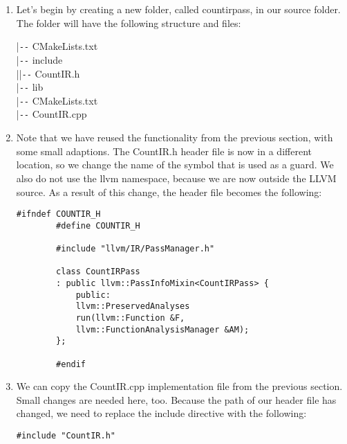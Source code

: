 \begin{enumerate}
	\item Let's begin by creating a new folder, called countirpass, in our source folder. The 
	folder will have the following structure and files:
	\begin{tcolorbox}[colback=white,colframe=black]
		|\verb|--| CMakeLists.txt \\
		|\verb|--| include \\
		|\hspace{1cm}|\verb|--| CountIR.h \\
		|\verb|--| lib \\
		\hspace*{0.8cm}|\verb|--| CMakeLists.txt \\
		\hspace*{0.8cm}|\verb|--| CountIR.cpp
	\end{tcolorbox}
	
	\item Note that we have reused the functionality from the previous section, with some small adaptions. The CountIR.h header file is now in a different location, so we change the name of the symbol that is used as a guard. We also do not use the llvm namespace, because we are now outside the LLVM source. As a result of this change, the header file becomes the following:
	\begin{lstlisting}[caption={}]
		#ifndef COUNTIR_H
		#define COUNTIR_H
		
		#include "llvm/IR/PassManager.h"
		
		class CountIRPass
		: public llvm::PassInfoMixin<CountIRPass> {
			public:
			llvm::PreservedAnalyses
			run(llvm::Function &F,
			llvm::FunctionAnalysisManager &AM);
		};
		
		#endif
	\end{lstlisting}
	
	\item We can copy the CountIR.cpp implementation file from the previous section. Small changes are needed here, too. Because the path of our header file has changed, we need to replace the include directive with the following:
	\begin{lstlisting}[caption={}]
		#include "CountIR.h"
	\end{lstlisting}
	

\end{enumerate}

